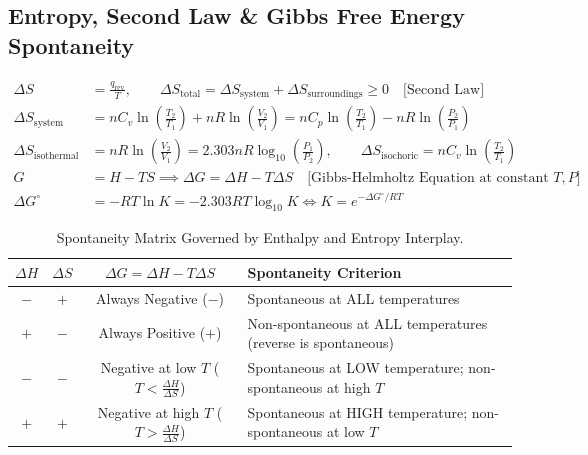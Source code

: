 \documentclass[11pt,a4paper]{article}
\begin{document}
\subsection{Entropy, Second Law \& Gibbs Free Energy Spontaneity}

\begin{formulabox}
\begin{align}
  \Delta S &= \frac{q_{\text{rev}}}{T}, \qquad \Delta S_{\text{total}} = \Delta S_{\text{system}} + \Delta S_{\text{surroundings}} \ge 0 \quad \text{[Second Law]} \\
  \Delta S_{\text{system}} &= n C_v \ln\left(\frac{T_2}{T_1}\right) + n R \ln\left(\frac{V_2}{V_1}\right) = n C_p \ln\left(\frac{T_2}{T_1}\right) - n R \ln\left(\frac{P_2}{P_1}\right) \\
  \Delta S_{\text{isothermal}} &= n R \ln\left(\frac{V_2}{V_1}\right) = 2.303 n R \log_{10}\left(\frac{P_1}{P_2}\right), \qquad \Delta S_{\text{isochoric}} = n C_v \ln\left(\frac{T_2}{T_1}\right) \\
  G &= H - T S \implies \Delta G = \Delta H - T \Delta S \quad \text{[Gibbs-Helmholtz Equation at constant } T, P\text{]} \\
  \Delta G^\circ &= -R T \ln K = -2.303 R T \log_{10} K \iff K = e^{-\Delta G^\circ / RT}
\end{align}
\end{formulabox}

\begin{table}[htbp]
\centering
\small
\renewcommand{\arraystretch}{1.2}
\begin{tabularx}{\textwidth}{c c c L}
\toprule
$\Delta H$ & $\Delta S$ & $\Delta G = \Delta H - T\Delta S$ & \textbf{Spontaneity Criterion} \\
\midrule
$-$ & $+$ & Always Negative ($-$) & Spontaneous at ALL temperatures \\
$+$ & $-$ & Always Positive ($+$) & Non-spontaneous at ALL temperatures (reverse is spontaneous) \\
$-$ & $-$ & Negative at low $T$ ($T < \frac{\Delta H}{\Delta S}$) & Spontaneous at LOW temperature; non-spontaneous at high $T$ \\
$+$ & $+$ & Negative at high $T$ ($T > \frac{\Delta H}{\Delta S}$) & Spontaneous at HIGH temperature; non-spontaneous at low $T$ \\
\bottomrule
\end{tabularx}
\caption{Spontaneity Matrix Governed by Enthalpy and Entropy Interplay.}
\end{table}
\end{document}
